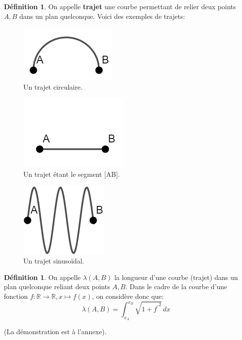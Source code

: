\documentclass{amsart}
\theoremstyle{definition}
\newtheorem{definition}[theorem]{Définition}
\theoremstyle{remark}
\numberwithin{equation}{section}
\begin{document}
\begin{definition}
  On appelle \textbf{trajet} une courbe permettant de relier deux points $A,B$ dans un plan quelconque. Voici des exemples de trajets:

  \begin{figure}[H]
    \centering
    \includegraphics[scale=0.5]{circle.png}
    \caption{Un trajet circulaire.}
  \end{figure}

  \begin{figure}[H]
    \centering
    \includegraphics[scale=0.5]{line.png}
    \caption{Un trajet étant le segment [AB].}
  \end{figure}

  \begin{figure}[H]
    \centering
    \includegraphics[scale=0.5]{sinus.png}
    \caption{Un trajet sinusoïdal.}
  \end{figure}
\end{definition}

\begin{definition}
  On appelle $\lambda(A,B)$ la longueur d'une courbe (trajet) dans un plan quelconque reliant deux points $A,B$. Dans le cadre de la courbe d'une fonction $f:\mathbb{R}\longrightarrow \mathbb{R}, x\longmapsto f(x)$,
  on considère donc que: \[\lambda(A,B)=\int_{x_A}^{x_B} \sqrt{1+{f^\prime}^2} \,dx\]
  
  (La démonstration est à l'annexe).
\end{definition}
\end{document}
